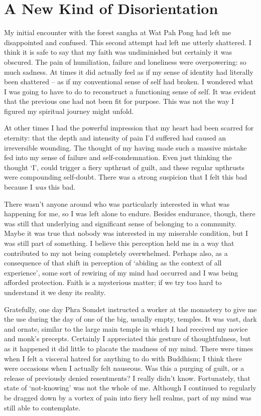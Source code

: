 \chapter{A New Kind of Disorientation}

My initial encounter with the forest sangha at Wat Pah Pong had left me
disappointed and confused. This second attempt had left me utterly
shattered. I think it is safe to say that my faith was undiminished but
certainly it was obscured. The pain of humiliation, failure and
loneliness were overpowering: so much sadness. At times it did actually
feel as if my sense of identity had literally been shattered -- as if my
conventional sense of self had broken. I wondered what I was going to
have to do to reconstruct a functioning sense of self. It was evident
that the previous one had not been fit for purpose. This was not the way
I figured my spiritual journey might unfold.

At other times I had the powerful impression that my heart had been
scarred for eternity: that the depth and intensity of pain I'd suffered
had caused an irreversible wounding. The thought of my having made such
a massive mistake fed into my sense of failure and self-condemnation.
Even just thinking the thought `I', could trigger a fiery upthrust of
guilt, and these regular upthrusts were compounding \mbox{self-doubt}. There
was a strong suspicion that I felt this bad because I \emph{was} this
bad.

There wasn't anyone around who was particularly interested in what was
happening for me, so I was left alone to endure. Besides endurance,
though, there was still that underlying and significant sense of
belonging to a community. Maybe it was true that nobody was interested
in my miserable condition, but I was still part of something. I believe
this perception held me in a way that contributed to my not being
completely overwhelmed. Perhaps also, as a consequence of that shift in
perception of `abiding as the context of all experience', some sort of
rewiring of my mind had occurred and I was being afforded protection.
Faith is a mysterious matter; if we try too hard to understand it we
deny its reality.

Gratefully, one day Phra Somdet instructed a worker at the monastery to
give me the use during the day of one of the big, usually empty,
temples. It was vast, dark and ornate, similar to the large main temple
in which I had received my novice and monk's precepts. Certainly I
appreciated this gesture of thoughtfulness, but as it happened it did
little to placate the madness of my mind. There were times when I felt a
visceral hatred for anything to do with Buddhism; I think there were
occasions when I actually felt nauseous. Was this a purging of guilt, or
a release of previously denied resentments? I really didn't know.
Fortunately, that state of `not-knowing' was not the whole of me.
Although I continued to regularly be dragged down by a vortex of pain
into fiery hell realms, part of my mind was still able to contemplate.

